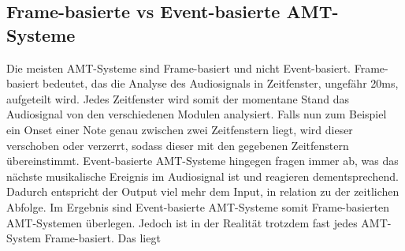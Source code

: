 \subsection{Frame-basierte vs Event-basierte AMT-Systeme}
Die meisten AMT-Systeme sind Frame-basiert und nicht Event-basiert.
Frame-basiert bedeutet, das die Analyse des Audiosignals in Zeitfenster, ungefähr 20ms, aufgeteilt wird.
Jedes Zeitfenster wird somit der momentane Stand das Audiosignal von den verschiedenen Modulen analysiert.
Falls nun zum Beispiel ein Onset einer Note genau zwischen zwei Zeitfenstern liegt,
wird dieser verschoben oder verzerrt, sodass dieser mit den gegebenen Zeitfenstern übereinstimmt.
Event-basierte AMT-Systeme hingegen fragen immer ab,
was das nächste musikalische Ereignis im Audiosignal ist und reagieren dementsprechend.
Dadurch entspricht der Output viel mehr dem Input, in relation zu der zeitlichen Abfolge.
Im Ergebnis sind Event-basierte AMT-Systeme somit Frame-basierten AMT-Systemen überlegen.
Jedoch ist in der Realität trotzdem fast jedes AMT-System Frame-basiert.
Das liegt %



